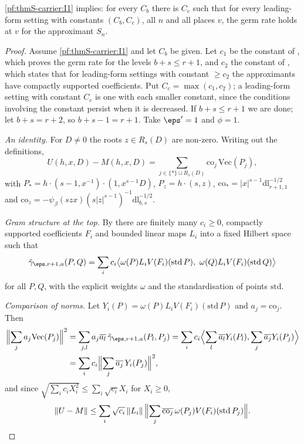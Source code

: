 \begin{theorem}\label{pf:thmS-carrier:germrate}
\ref{pf:thmS-carrier:I1} implies: for every $C_b$ there is $C_c$ such that for every leading-form setting with constants
$(C_b,C_c)$, all $n$ and all places $v$, the germ rate holds at $v$ for the approximant $S_n$.
\end{theorem}

\begin{proof}
Assume \ref{pf:thmS-carrier:I1} and let $C_b$ be given. Let $c_1$ be the constant of
, which proves the germ rate for the levels $b+s\le r+1$, and $c_2$
the constant of , which states that for leading-form
settings with constant $\ge c_2$ the approximants have compactly supported coefficients. Put $C_c=\max(c_1,c_2)$; a
leading-form setting with constant $C_c$ is one with each smaller constant, since the conditions involving the constant
persist when it is decreased. If $b+s\le r+1$ we are done; let $b+s=r+2$, so
$b+s-1=r+1$. Take $\eps'=1$ and $\phi=1$.

\emph{An identity.} For $D\ne0$ the roots $z\in R_s(D)$ are non-zero. Writing out the definitions,
\[
U(h,x,D)-M(h,x,D)=\sum_{j\in\{\ast\}\sqcup R_s(D)}\mathrm{co}_j\,\mathrm{Vec}(P_j),
\]
with $P_\ast=h\cdot(s-1,x^{-1})\cdot(1,x^{s-1}D)$, $P_z=h\cdot(s,z)$, $\mathrm{co}_\ast=|x|^{s-1}\mathrm{dl}_{r+1,1}^{-1/2}$ and
$\mathrm{co}_z=-\psi_\beta(szx)(s|z|^{s-1})^{-1}\mathrm{dl}_{b,s}^{-1/2}$.

\emph{Gram structure at the top.} By  there are finitely many
$c_i\ge0$, compactly supported coefficients $F_i$ and bounded linear maps $L_i$ into a fixed Hilbert space such that
\[
\tilde\gamma_{\eps,r+1,a}(P,Q)=\sum_ic_i\bigl\langle\omega(P)L_iV(F_i)(\mathrm{std}\,P),\ \omega(Q)L_iV(F_i)(\mathrm{std}\,Q)
\bigr\rangle
\]
for all $P,Q$, with the explicit weights $\omega$ and the standardisation of points $\mathrm{std}$.

\emph{Comparison of norms.} Let $Y_i(P)=\omega(P)L_iV(F_i)(\mathrm{std}\,P)$ and $a_j=\mathrm{co}_j$. Then
\begin{align*}
\Bigl\|\sum_ja_j\mathrm{Vec}(P_j)\Bigr\|^2&=\sum_{j,l}a_j\overline{a_l}\,\tilde\gamma_{\eps,r+1,a}(P_l,P_j)
=\sum_ic_i\Bigl\langle\sum_l\overline{a_l}Y_i(P_l),\sum_j\overline{a_j}Y_i(P_j)\Bigr\rangle\\
&=\sum_ic_i\Bigl\|\sum_j\overline{a_j}\,Y_i(P_j)\Bigr\|^2,
\end{align*}
and since $\sqrt{\sum_ic_iX_i^2}\le
\sum_i\sqrt{c_i}X_i$ for $X_i\ge0$,
\[
\|U-M\|\le\sum_i\sqrt{c_i}\,\|L_i\|\,\Bigl\|\sum_j\overline{\mathrm{co}_j}\,\omega(P_j)V(F_i)(\mathrm{std}\,P_j)\Bigr\| .
\]


\end{proof}
